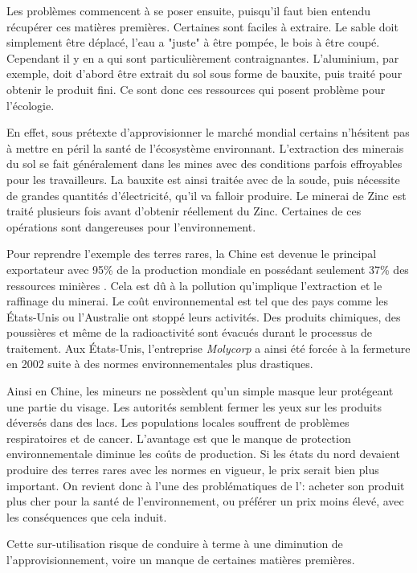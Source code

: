 Les problèmes commencent à se poser ensuite, puisqu'il faut bien entendu récupérer ces matières premières. Certaines sont faciles à extraire. Le sable doit simplement être déplacé, l'eau a "juste" à être pompée, le bois à être coupé. Cependant il y en a qui sont particulièrement contraignantes. L'aluminium, par exemple, doit d'abord être extrait du sol sous forme de bauxite, puis traité pour obtenir le produit fini. Ce sont donc ces ressources qui posent problème pour l'écologie.

En effet, sous prétexte d'approvisionner le marché mondial certains n'hésitent pas à mettre en péril la santé de l'écosystème environnant. L'extraction des minerais du sol se fait généralement dans les mines avec des conditions parfois effroyables pour les travailleurs. La bauxite est ainsi traitée avec de la soude, puis nécessite de grandes quantités d’électricité, qu'il va falloir produire. Le minerai de Zinc est traité plusieurs fois avant d'obtenir réellement du Zinc. Certaines de ces opérations sont dangereuses pour l'environnement.

\bigbreak
Pour reprendre l'exemple des terres rares, la Chine est devenue le principal exportateur avec 95\% de la production mondiale en possédant seulement 37\% des ressources minières \cite{MongolieChine}. Cela est dû à la pollution qu'implique l'extraction et le raffinage du minerai. Le coût environnemental est tel que des pays comme les États-Unis ou l'Australie ont stoppé leurs activités. Des produits chimiques, des poussières et même de la radioactivité sont évacués durant le processus de traitement. Aux États-Unis, l'entreprise \textit{Molycorp} a ainsi été forcée à la fermeture en 2002 suite à des normes environnementales plus drastiques.

Ainsi en Chine, les mineurs ne possèdent qu'un simple masque leur protégeant une partie du visage. Les autorités semblent fermer les yeux sur les produits déversés dans des lacs. Les populations locales souffrent de problèmes respiratoires et de cancer. L'avantage est que le manque de protection environnementale diminue les coûts de production. Si les états du nord devaient produire des terres rares avec les normes en vigueur, le prix serait bien plus important. On revient donc à l'une des problématiques de l'\op : acheter son produit plus cher pour la santé de l'environnement, ou préférer un prix moins élevé, avec les conséquences que cela induit.


\bigbreak Cette sur-utilisation risque de conduire à terme à une diminution de l'approvisionnement, voire un manque de certaines matières premières.


